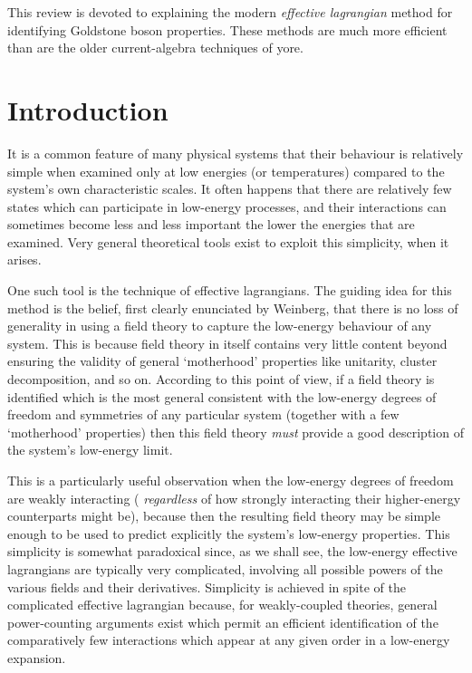 This review is devoted to explaining the modern {\it
effective lagrangian} method for identifying Goldstone
boson properties. These methods are much more efficient
than are the older current-algebra techniques of yore. 

\section{Introduction}

It is a common feature of many physical systems that their
behaviour is relatively simple when examined only at low
energies (or temperatures) compared to the system's own
characteristic scales. It often happens that there are
relatively few states which can participate in low-energy
processes, and their interactions can sometimes become less
and less important the lower the energies that are examined.
Very general theoretical tools exist to exploit this
simplicity, when it arises.

One such tool is the technique of effective lagrangians.
The guiding idea for this method is the belief, first
clearly enunciated by Weinberg, that there is no loss of
generality in using a field theory to capture the
low-energy behaviour of any system. This is because field
theory in itself contains very little content beyond
ensuring the validity of general `motherhood' properties
like unitarity, cluster decomposition, and so on. 
According to this point of view, if a field theory is
identified which is the most general consistent with the
low-energy degrees of freedom and symmetries of any
particular system (together with a few `motherhood'
properties) then this field theory {\it must} provide a
good description of the system's low-energy limit.

This is a particularly useful observation when the
low-energy degrees of freedom are weakly interacting ({\it
regardless} of how strongly interacting their higher-energy
counterparts might be), because then the resulting field
theory may be simple enough to be used to predict
explicitly the system's low-energy properties. This
simplicity is somewhat paradoxical since, as we shall see,
the low-energy effective lagrangians are typically very
complicated, involving all possible powers of the various
fields and their derivatives. Simplicity is achieved in
spite of the complicated effective lagrangian because, for
weakly-coupled theories, general power-counting arguments
exist which permit an efficient identification of the
comparatively few interactions which appear at any given
order in a low-energy expansion.

